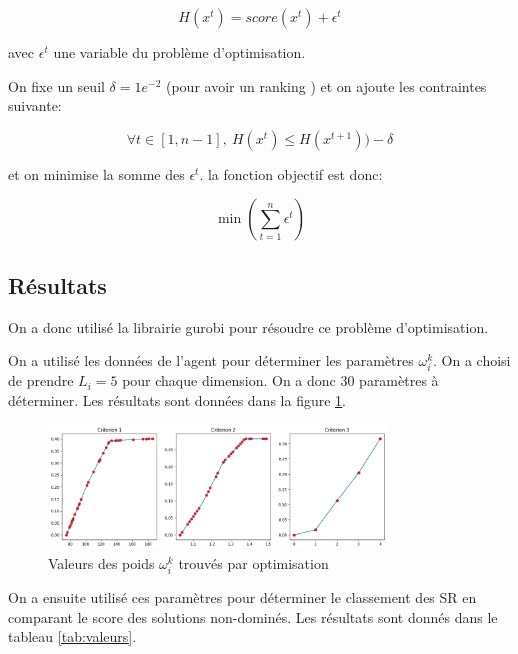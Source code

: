 \begin{equation}
    H(x^t) =  score(x^t) + \epsilon^t
\end{equation}

avec $\epsilon^t$ une variable du problème d'optimisation.

On fixe un seuil $\delta = 1e^{-2}$ (pour avoir un ranking ) et on ajoute les contraintes suivante:

\begin{equation}
    \forall t \in [1,n-1],\ H(x^t) \leq H(x^{t+1})) - \delta
\end{equation}

et on minimise la somme des $\epsilon^t$. la fonction objectif est donc:

\begin{equation}
    \min( \sum_{t=1}^{n} \epsilon^t )
\end{equation}

\subsection{Résultats}

On a donc utilisé la librairie gurobi pour résoudre ce problème d'optimisation.

On a utilisé les données de l'agent pour déterminer les paramètres $\omega_i^k$. On 
a choisi de prendre $L_i = 5$ pour chaque dimension. On a donc 30 paramètres à déterminer. 
Les résultats sont données dans la figure \ref{fig:omega}.

\begin{figure}[H]
    \centering
    \includegraphics[width=0.8\textwidth]{Images/step_4/resultats_omega.png}
    \caption{Valeurs des poids $\omega_i^k$ trouvés par optimisation}
    \label{fig:omega}
\end{figure}

On a ensuite utilisé ces paramètres pour déterminer le classement des SR en
comparant le score des solutions non-dominés. Les résultats sont donnés dans 
le tableau \ref{tab:valeurs}.

